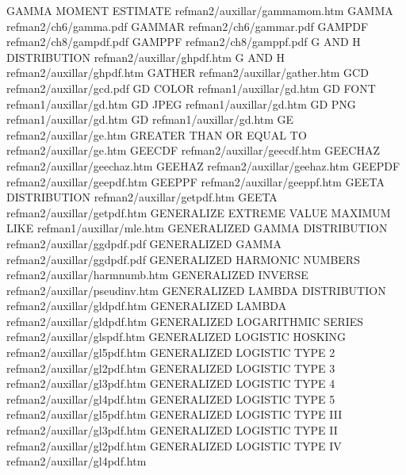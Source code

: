GAMMA MOMENT ESTIMATE                   refman2/auxillar/gammamom.htm
GAMMA                                   refman2/ch6/gamma.pdf
GAMMAR                                  refman2/ch6/gammar.pdf
GAMPDF                                  refman2/ch8/gampdf.pdf
GAMPPF                                  refman2/ch8/gamppf.pdf
G AND H DISTRIBUTION                    refman2/auxillar/ghpdf.htm
G AND H                                 refman2/auxillar/ghpdf.htm
GATHER                                  refman2/auxillar/gather.htm
GCD                                     refman2/auxillar/gcd.pdf
GD COLOR                                refman1/auxillar/gd.htm
GD FONT                                 refman1/auxillar/gd.htm
GD JPEG                                 refman1/auxillar/gd.htm
GD PNG                                  refman1/auxillar/gd.htm
GD                                      refman1/auxillar/gd.htm
GE                                      refman2/auxillar/ge.htm
GREATER THAN OR EQUAL TO                refman2/auxillar/ge.htm
GEECDF                                  refman2/auxillar/geecdf.htm
GEECHAZ                                 refman2/auxillar/geechaz.htm
GEEHAZ                                  refman2/auxillar/geehaz.htm
GEEPDF                                  refman2/auxillar/geepdf.htm
GEEPPF                                  refman2/auxillar/geeppf.htm
GEETA DISTRIBUTION                      refman2/auxillar/getpdf.htm
GEETA                                   refman2/auxillar/getpdf.htm
GENERALIZE EXTREME VALUE MAXIMUM LIKE   refman1/auxillar/mle.htm
GENERALIZED GAMMA DISTRIBUTION          refman2/auxillar/ggdpdf.pdf
GENERALIZED GAMMA                       refman2/auxillar/ggdpdf.pdf
GENERALIZED HARMONIC NUMBERS            refman2/auxillar/harmnumb.htm
GENERALIZED INVERSE                     refman2/auxillar/pseudinv.htm
GENERALIZED LAMBDA DISTRIBUTION         refman2/auxillar/gldpdf.htm
GENERALIZED LAMBDA                      refman2/auxillar/gldpdf.htm
GENERALIZED LOGARITHMIC SERIES          refman2/auxillar/glspdf.htm
GENERALIZED LOGISTIC HOSKING            refman2/auxillar/gl5pdf.htm
GENERALIZED LOGISTIC TYPE 2             refman2/auxillar/gl2pdf.htm
GENERALIZED LOGISTIC TYPE 3             refman2/auxillar/gl3pdf.htm
GENERALIZED LOGISTIC TYPE 4             refman2/auxillar/gl4pdf.htm
GENERALIZED LOGISTIC TYPE 5             refman2/auxillar/gl5pdf.htm
GENERALIZED LOGISTIC TYPE III           refman2/auxillar/gl3pdf.htm
GENERALIZED LOGISTIC TYPE II            refman2/auxillar/gl2pdf.htm
GENERALIZED LOGISTIC TYPE IV            refman2/auxillar/gl4pdf.htm
